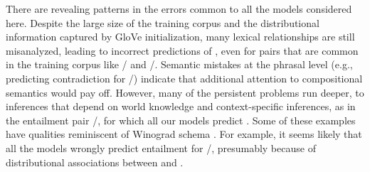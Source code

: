
There are revealing patterns in the errors common to all the models
considered here. Despite the large size of the training corpus and the
distributional information captured by GloVe initialization, many
lexical relationships are still misanalyzed, leading to incorrect
predictions of , even for pairs that are common in the
training corpus like / and
/. Semantic mistakes at the phrasal level
(e.g., predicting contradiction for /) indicate
that additional attention to compositional semantics would pay off.
%
%
However, many of the persistent problems run deeper, to inferences
that depend on world knowledge and context-specific inferences, as in
the entailment pair /, for which all our
models predict . Some of these examples have qualities
reminiscent of Winograd schema \cite{Winograd:1972,Levesque:2013}. For
example, it seems likely that all the models wrongly predict
entailment for /, presumably because of
distributional associations between  and .





